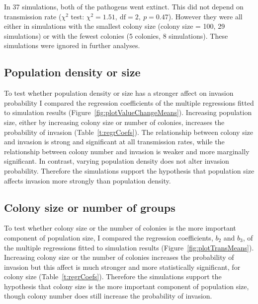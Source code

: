 In 37 simulations, both of the pathogens went extinct.
This did not depend on transmission rate ($\chi^2$ test: $\chi^2 = 1.51,\: \text{df} = 2,\: p = 0.47$).
However they were all either in simulations with the smallest colony size (colony size = 100, 29 simulations) or with the fewest colonies (5 colonies, 8 simulations).
These simulations were ignored in further analyses.



\subsection{Population density or size}

To test whether population density or size has a stronger affect on invasion probability I compared the regression coefficients of the multiple regressions fitted to simulation results (Figure~\ref{fig:plotValueChangeMeans}).
Increasing population size, either by increasing colony size or number of colonies, increases the probability of invasion (Table~\ref{t:regrCoefs}).
The relationship between colony size and invasion is strong and significant at all transmission rates, while the relationship between colony number and invasion is weaker and more marginally significant.
In contrast, varying population density does not alter invasion probability.
Therefore the simulations support the hypothesis that population size affects invasion more strongly than population density.


\subsection{Colony size or number of groups}

To test whether colony size or the number of colonies is the more important component of population size, I compared the regression coefficients, $b_2$ and $b_3$, of the multiple regressions fitted to simulation results (Figure~\ref{fig:plotTransMeans}).
Increasing colony size or the number of colonies increases the probability of invasion but this affect is much stronger and more statistically significant, for colony size (Table~\ref{t:regrCoefs}).
Therefore the simulations support the hypothesis that colony size is the more important component of population size, though colony number does still increase the probability of invasion.





